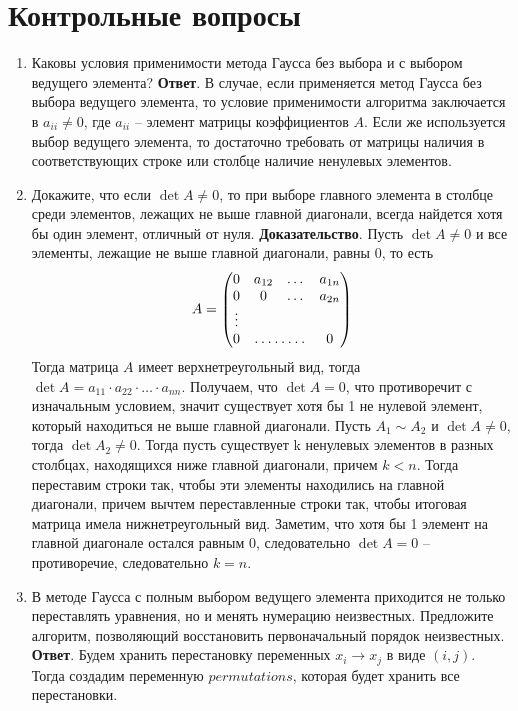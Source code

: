 \documentclass{article}
\begin{document}
\section{Контрольные вопросы}
\begin{enumerate}
    \item Каковы условия применимости метода Гаусса без выбора
    и с выбором ведущего элемента?
    \newline
    {\bfseries Ответ}.
    В случае, если применяется метод Гаусса без выбора ведущего элемента, то условие применимости 
    алгоритма заключается в $a_{ii} \neq 0$, где $a_{ii}$ -- элемент матрицы коэффициентов $A$.
    Если же используется выбор ведущего элемента, то достаточно требовать от матрицы наличия
    в соответствующих строке или столбце наличие ненулевых элементов.
    \item Докажите, что если $\det A \neq 0$, то при выборе главного
    элемента в столбце среди элементов, лежащих не выше
    главной диагонали, всегда найдется хотя бы один элемент,
    отличный от нуля.
    \newline
    {\bfseries Доказательство}. Пусть $\det A \neq 0$ и все элементы, лежащие не выше главной диагонали, равны 0,
    то есть
    \begin{equation*}
        A = 
        \begin{pmatrix}
            0 &  a_{12} & \dots & a_{1n} \\ 
            0 & 0 & \dots & a_{2n} \\ 
            \vdots &&& \\
            0 & \hdotsfor{2} & 0
        \end{pmatrix}
    \end{equation*}    
    Тогда матрица $A$ имеет верхнетреугольный вид, тогда $\det A = a_{11} \cdot a_{22} \cdot \ldots \cdot a_{nn}$.
    Получаем, что $\det A = 0$, что противоречит с изначальным условием, значит существует хотя бы 1 не нулевой элемент,
    который находиться не выше главной диагонали.
    Пусть $A_1 \sim A_2$ и $\det A \neq 0$, тогда $\det A_2 \neq 0$.
    Тогда пусть существует k ненулевых элементов в разных столбцах, находящихся ниже главной диагонали,
    причем $k < n$.
    Тогда переставим строки так, чтобы эти элементы находились на главной диагонали, причем 
    вычтем переставленные строки так, чтобы итоговая матрица имела нижнетреугольный вид. Заметим, что
    хотя бы 1 элемент на главной диагонале остался равным 0, следовательно $\det A = 0$ --
    противоречие, следовательно $k = n$.
    \item В методе Гаусса с полным выбором ведущего элемента
    приходится не только переставлять уравнения, но и менять нумерацию неизвестных. 
    Предложите алгоритм, позволяющий восстановить первоначальный порядок неизвестных.
    \newline
    {\bfseries Ответ}.
    Будем хранить перестановку переменных $x_i \rightarrow x_j$ в виде $(i, j)$.
    Тогда создадим переменную $permutations$, которая будет хранить все перестановки.


\end{enumerate}
\end{document}
